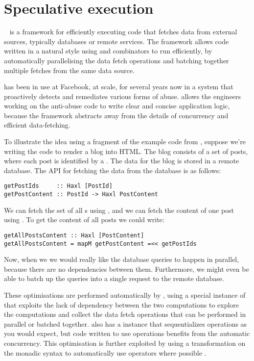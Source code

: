 \section{Speculative execution}\label{sec-haxl}

\Haxl~\citep{marlow2014haxl} is a framework for efficiently executing
code that fetches data from external sources, typically databases or
remote services. The \Haxl framework allows code written in a natural
style using  and  combinators to run
efficiently, by automatically parallelising the data fetch operations
and batching together multiple fetches from the same data source.

\Haxl has been in use at Facebook, at scale, for several years now in
a system that proactively detects and remediates various forms of
abuse. \Haxl allows the engineers working on the anti-abuse code to
write clear and concise application logic, because the framework
abstracts away from the details of concurrency and efficient
data-fetching.

To illustrate the idea using a fragment of the example code from
\citep{marlow2014haxl}, suppose we're writing the code to render a blog into
HTML. The blog consists of a set of posts, where each post is
identified by a .  The data for the blog is stored in a
remote database.  The API for fetching the data from the database is
as follows:

\begin{verbatim}
getPostIds     :: Haxl [PostId]
getPostContent :: PostId -> Haxl PostContent
\end{verbatim}

We can fetch the set of all s using , and we
can fetch the content of one post using . To get
the content of all posts we could write:

\begin{verbatim}
getAllPostsContent :: Haxl [PostContent]
getAllPostsContent = mapM getPostContent =<< getPostIds
\end{verbatim}

Now, when we  we would really like the
database queries to happen in parallel, because there are no
dependencies between them. Furthermore, we might even be able to batch
up the queries into a single request to the remote database.

These optimisations are performed automatically by \Haxl, using a
special instance of  that exploits the lack of
dependency between the two computations to explore the computations
and collect the data fetch operations that can be performed in
parallel or batched together. \Haxl also has a  instance
that sequentializes operations as you would expect, but code written
to use  operations benefits from the automatic
concurrency. This optimisation is further exploited by using a
transformation on the monadic  syntax to automatically use
 operators where possible \cite{applicative-do}.

